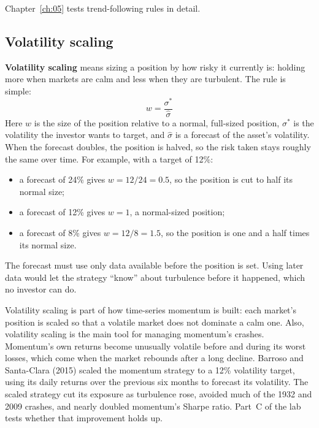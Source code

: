 Chapter~\ref{ch:05} tests trend-following rules in detail.


\subsection{Volatility scaling}

\textbf{Volatility scaling} means sizing a position by how risky it currently is: holding more when markets are calm and less when they are turbulent. The rule is simple:
\begin{equation}
  w = \frac{\sigma^*}{\hat\sigma}
  \label{eq:05-volscale}
\end{equation}
Here $w$ is the size of the position relative to a normal, full-sized position, $\sigma^*$ is the volatility the investor wants to target, and $\hat\sigma$ is a forecast of the asset's volatility. When the forecast doubles, the position is halved, so the risk taken stays roughly the same over time. For example, with a target of 12\%:

\begin{itemize}
  \item a forecast of 24\% gives $w = 12/24 = 0.5$, so the position is cut to half its normal size;
  \item a forecast of 12\% gives $w = 1$, a normal-sized position;
  \item a forecast of 8\% gives $w = 12/8 = 1.5$, so the position is one and a half times its normal size.
\end{itemize}

The forecast must use only data available before the position is set. Using later data would let the strategy ``know'' about turbulence before it happened, which no investor can do.

Volatility scaling is part of how time-series momentum is built: each market's position is scaled so that a volatile market does not dominate a calm one. 
Also, volatility scaling is the main tool for managing momentum's crashes. Momentum's own returns become unusually volatile before and during its worst losses, which come when the market rebounds after a long decline. Barroso and Santa-Clara (2015) scaled the momentum strategy to a 12\% volatility target, using its daily returns over the previous six months to forecast its volatility. The scaled strategy cut its exposure as turbulence rose, avoided much of the 1932 and 2009 crashes, and nearly doubled momentum's Sharpe ratio. Part~C of the lab tests whether that improvement holds up.

